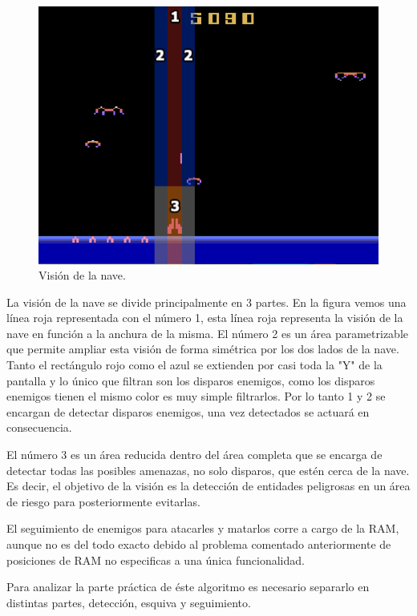 \begin{figure}[H]
	\centering
	\includegraphics[width=1\textwidth]{Figures/demonAttackVision}
	\caption{Visión de la nave.}
	\label{fig:demonAttackVision}
\end{figure}

La visión de la nave se divide principalmente en 3 partes. En la figura vemos una línea roja representada con el número 1, esta línea roja representa la visión de la nave en función a la anchura de la misma. El número 2 es un área parametrizable que permite ampliar esta visión de forma simétrica por los dos lados de la nave. Tanto el rectángulo rojo como el azul se extienden por casi toda la "Y" de la pantalla y lo único que filtran son los disparos enemigos, como los disparos enemigos tienen el mismo color es muy simple filtrarlos. Por lo tanto 1 y 2 se encargan de detectar disparos enemigos, una vez detectados se actuará en consecuencia.

El número 3 es un área reducida dentro del área completa que se encarga de detectar todas las posibles amenazas, no solo disparos, que estén cerca de la nave. Es decir, el objetivo de la visión es la detección de entidades peligrosas en un área de riesgo para posteriormente evitarlas.

El seguimiento de enemigos para atacarles y matarlos corre a cargo de la RAM, aunque no es del todo exacto debido al problema comentado anteriormente de posiciones de RAM no especificas a una única funcionalidad.

Para analizar la parte práctica de éste algoritmo es necesario separarlo en distintas partes, detección, esquiva y seguimiento.

